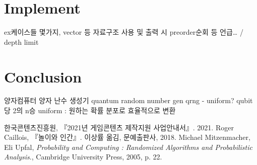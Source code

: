 \documentclass[11pt]{article}
\begin{document}









\section{Implement}
ex케이스들 몇가지, vector 등 자료구조 사용 및 출력 시 preorder순회 등 언급… / depth limit

\section{Conclusion}
양자컴퓨터 양자 난수 생성기
quantum random number gen qrng - uniform?
qubit 당 2의 n승 uniform : 원하는 확률 분포로 효율적으로 변환

\begin{thebibliography}{99}
한국콘텐츠진흥원, 『2021년 게임콘텐츠 제작지원 사업안내서』. 2021.
Roger Caillois, 『놀이와 인간』. 이상률 옮김, 문예출판사, 2018.
Michael Mitzenmacher, Eli Upfal, \textit{Probability and Computing : Randomized Algorithms and Probabilistic Analysis}., Cambridge University Press, 2005, p. 22.

\end{thebibliography}
\end{document}
